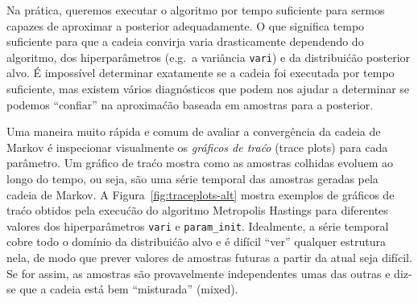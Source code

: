 Na pr\'atica, queremos executar o algoritmo por tempo suficiente para sermos
capazes de aproximar a posterior adequadamente. O que significa tempo suficiente para
que a cadeia convirja varia drasticamente dependendo do algoritmo, dos
hiperpar\^ametros (e.g.\ a vari\^ancia \lstinline{vari}) e da distribui\'c\~ao
posterior alvo. \'E imposs\'ivel determinar exatamente se a cadeia foi
executada por tempo suficiente, mas existem v\'arios diagn\'osticos que podem
nos ajudar a determinar se podemos ``confiar'' na aproxima\'c\~ao baseada em
amostras para a posterior.

Uma maneira muito r\'apida e comum de avaliar a converg\^encia da cadeia de Markov
\'e inspecionar visualmente os \emph{gr\'aficos de tra\'co} (trace plots) para cada
par\^ametro. Um gr\'afico de tra\'co mostra como as amostras colhidas evoluem ao
longo do tempo, ou seja, s\~ao uma s\'erie temporal das amostras geradas pela
cadeia de Markov. A Figura~\ref{fig:traceplots-alt} mostra exemplos de gr\'aficos de tra\'co
obtidos pela execu\'c\~ao do algoritmo Metropolis Hastings para diferentes valores
dos hiperpar\^ametros \lstinline{vari} e \lstinline{param_init}. Idealmente, a
s\'erie temporal cobre todo o dom\'inio da distribui\'c\~ao alvo e \'e dif\'icil
``ver'' qualquer estrutura nela, de modo que prever valores de amostras futuras a
partir da atual seja dif\'icil. Se for assim, as amostras s\~ao provavelmente independentes
umas das outras e diz-se que a cadeia est\'a bem ``misturada'' (mixed).



